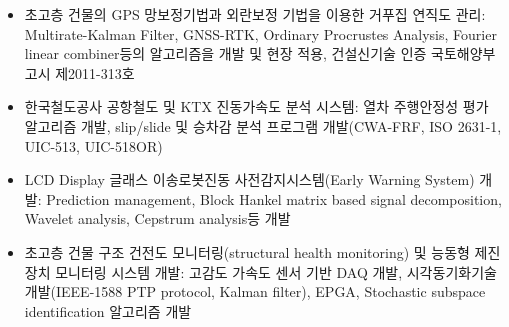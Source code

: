 \documentclass[10pt,a4paper,ragged2e]{altacv}
\begin{document}
\divider

\begin{itemize}
\item 초고층 건물의 GPS 망보정기법과 외란보정 기법을 이용한 거푸집 연직도 관리: Multirate-Kalman Filter, GNSS-RTK, Ordinary Procrustes Analysis, Fourier linear combiner등의 알고리즘을 개발 및 현장 적용, 건설신기술 인증 국토해양부고시 제2011-313호
\item 한국철도공사 공항철도 및 KTX 진동가속도 분석 시스템: 열차 주행안정성 평가 알고리즘 개발, slip/slide 및 승차감 분석 프로그램 개발(CWA-FRF, ISO 2631-1, UIC-513, UIC-518OR)
\item LCD Display 글래스 이송로봇진동 사전감지시스템(Early Warning System) 개발: Prediction management, Block Hankel matrix based signal decomposition, Wavelet analysis, Cepstrum analysis등 개발
\item 초고층 건물 구조 건전도 모니터링(structural health monitoring) 및 능동형 제진장치 모니터링 시스템 개발: 고감도 가속도 센서 기반 DAQ 개발, 시각동기화기술 개발(IEEE-1588 PTP protocol, Kalman filter), EPGA, Stochastic subspace identification 알고리즘 개발
\end{itemize}

\divider

\clearpage
\begin{fullwidth}
% 
\nocite{*}
\printbibliography[type=thesis, heading=pubtype,title={\printinfo{\faBook}{Dissertation}}]
% 
\divider

\printbibliography[heading=pubtype,title={\printinfo{\faFileTextO}{Journal Articles (SCI/SCI-E)}}, type=article]

\divider

\printbibliography[heading=pubtype,title={\printinfo{\faGroup}{Conference Proceedings}},type=inproceedings]
\end{fullwidth}
\end{document}

